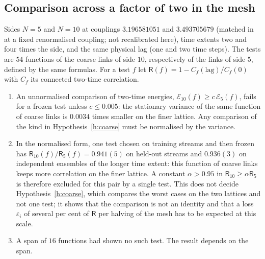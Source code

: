 \subsection{Comparison across a factor of two in the mesh}\label{s:cross}
Sides $N=5$ and $N=10$ at couplings $3.196581051$ and $3.493705679$ (matched in~\cite{Repo} at a fixed
renormalised coupling; not recalibrated here), time extents two and four times the side, and the same physical
lag (one and two time steps). The tests are $54$ functions of the coarse links of side $10$, respectively of
the links of side $5$, defined by the same formulas. For a test $f$ let
$\mathsf R(f)=1-C_f(\mathrm{lag})/C_f(0)$ with $C_f$ its connected two-time correlation.
\begin{enumerate}
\item An unnormalised comparison of two-time energies, $\mathcal E_{10}(f)\ge c\,\mathcal E_5(f)$, fails for a
frozen test unless $c\le0.005$: the stationary variance of the same function of coarse links is $0.0034$ times
smaller on the finer lattice. Any comparison of the kind in Hypothesis~\ref{h:coarse} must be normalised by
the variance.
\item In the normalised form, one test chosen on training streams and then frozen has
$\mathsf R_{10}(f)/\mathsf R_5(f)=0.941(5)$ on held-out streams and $0.936(3)$ on independent ensembles of the
longer time extent: this function of coarse links keeps more correlation on the finer lattice. A constant
$\alpha>0.95$ in $\mathsf R_{10}\ge\alpha\mathsf R_5$ is therefore excluded for this pair by a single test. This
does not decide Hypothesis~\ref{h:coarse}, which compares the worst cases on the two lattices and not one
test; it shows that the comparison is not an identity and that a loss $\varepsilon_i$ of several per cent of
$\mathsf R$ per halving of the mesh has to be expected at this scale.
\item A span of $16$ functions had shown no such test. The result depends on the span.
\end{enumerate}

